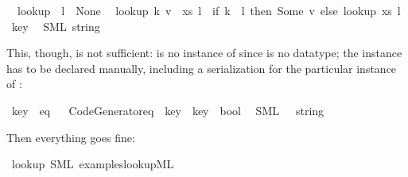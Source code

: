 \begin{isabellebody}
\ \ {\isachardoublequoteopen}lookup\ {\isacharbrackleft}{\isacharbrackright}\ l\ {\isacharequal}\ None{\isachardoublequoteclose}\isanewline
\ \ {\isachardoublequoteopen}lookup\ {\isacharparenleft}{\isacharparenleft}k{\isacharcomma}\ v{\isacharparenright}\ {\isacharhash}\ xs{\isacharparenright}\ l\ {\isacharequal}\ {\isacharparenleft}if\ k\ {\isacharequal}\ l\ then\ Some\ v\ else\ lookup\ xs\ l{\isacharparenright}{\isachardoublequoteclose}\isanewline
%
\isadelimtt
%
\endisadelimtt
%
\isatagtt
{}\isamarkupfalse%
\ key\isanewline
\ \ {\isacharparenleft}SML\ {\isachardoublequoteopen}string{\isachardoublequoteclose}{\isacharparenright}%
\endisatagtt
{\isafoldtt}%
%
\isadelimtt
%
\endisadelimtt
%
\begin{isamarkuptext}%
This, though, is not sufficient:  is no instance
  of  since  is no datatype; the instance
  has to be declared manually, including a serialization
  for the particular instance of :%
\end{isamarkuptext}%
\isamarkuptrue%
\isamarkupfalse%
\ key\ {\isacharcolon}{\isacharcolon}\ eq%
\isadelimproof
\ %
\endisadelimproof
%
\isatagproof
\isacommand{{\isachardot}{\isachardot}}\isamarkupfalse%
%
\endisatagproof
{\isafoldproof}%
%
\isadelimproof
%
\endisadelimproof
\isanewline
%
\isadelimtt
\isanewline
%
\endisadelimtt
%
\isatagtt
{}\isamarkupfalse%
\ {\isachardoublequoteopen}Code{\isacharunderscore}Generator{\isachardot}eq\ {\isasymColon}\ key\ {\isasymRightarrow}\ key\ {\isasymRightarrow}\ bool{\isachardoublequoteclose}\isanewline
\ \ {\isacharparenleft}SML\ {\isachardoublequoteopen}{\isacharbang}{\isacharparenleft}{\isacharunderscore}\ {\isacharcolon}\ string\ {\isacharequal}\ {\isacharunderscore}{\isacharparenright}{\isachardoublequoteclose}{\isacharparenright}%
\endisatagtt
{\isafoldtt}%
%
\isadelimtt
%
\endisadelimtt
%
\begin{isamarkuptext}%
Then everything goes fine:%
\end{isamarkuptext}%
\isamarkuptrue%
\isamarkupfalse%
\ lookup\ {\isacharparenleft}SML\ {\isachardoublequoteopen}examples{\isacharslash}lookup{\isachardot}ML{\isachardoublequoteclose}{\isacharparenright}%
\begin{isamarkuptext}%
%
\end{isamarkuptext}%
\isamarkuptrue%
%
\end{isabellebody}
